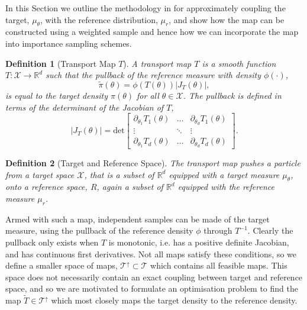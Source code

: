 \documentclass[final]{siamltex}
\newtheorem{dfn}{Definition}[section]
\begin{document}
In this Section we outline the methodology in
\cite{parno2014transport} for approximately coupling the target,
$\mu_{\theta}$, with the reference distribution, $\mu_r$, and
show how the map can be constructed using a weighted sample
and hence how we can incorporate the map into importance sampling schemes.

\begin{dfn}[Transport Map $T$]
	A transport map $T$ is a smooth function $T\colon
        \mathcal{X}\rightarrow\mathbb{R}^d$ such that the {\it
          pullback} of the reference measure with density $\phi(\cdot)$,
	\begin{equation}\label{eq:pullback}
		\tilde{\pi}(\theta) = \phi(T(\theta))|J_T(\theta)|,
	\end{equation}
	is equal to the target density $\pi(\theta)$ for all $\theta \in \mathcal{X}$. The pullback is defined in terms of the determinant of the Jacobian of $T$,
	\[
		|J_T(\theta)| = \text{det}\begin{bmatrix} \partial_{\theta_1} T_1(\theta) & \dots & \partial_{\theta_d} T_1(\theta) \\ \vdots & \ddots & \vdots \\ \partial_{\theta_1} T_d(\theta) & \dots & \partial_{\theta_d} T_d(\theta) \end{bmatrix}.
	\]
\end{dfn}


\begin{dfn}[Target and Reference Space]
	The transport map pushes a particle from a {\it target space} $\mathcal{X}$, that is a subset of $\mathbb{R}^d$ equipped with a target measure $\mu_{\theta}$, onto a {\it reference space}, $R$, again a subset of $\mathbb{R}^d$ equipped with the reference measure $\mu_r$.
\end{dfn}

Armed with such a map, independent samples can be made of the target
measure, using the pullback of the reference density $\phi$ through $T^{-1}$.
Clearly the pullback only exists when $T$ is monotonic, i.e. has a positive definite Jacobian, and has continuous first derivatives.
Not all maps satisfy these conditions, so we define a smaller space of
maps, $\mathcal{T}^\uparrow \subset \mathcal{T}$ which contains all
feasible maps. This space does not necessarily contain an exact
coupling between target and reference space, and so we are motivated to formulate an optimisation problem to find the map $\tilde{T}
\in \mathcal{T}^\uparrow$ which most closely maps the target density
to the reference density.
\end{document}
